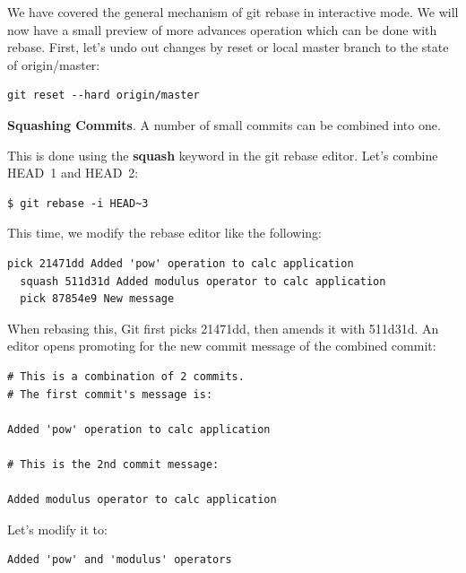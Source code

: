 \documentclass{../common/tufte-latex/tufte-handout}
\begin{document}
\noindent We have covered the general mechanism of git rebase in interactive mode. 
We will now have a small preview of more advances operation which can be done with rebase.
First, let's undo out changes by reset or local master branch to the state of origin/master:

\begin{lstlisting}[style=BashInputStyle]
  git reset --hard origin/master
\end{lstlisting}

\noindent \textbf{Squashing Commits}.
A number of small commits can be combined into one.

This is done using the \textbf{squash} keyword in the git rebase editor.
Let's combine HEAD~1 and HEAD~2:

\begin{lstlisting}[style=BashInputStyle]
  $ git rebase -i HEAD~3
\end{lstlisting}

This time, we modify the rebase editor like the following:
\begin{lstlisting}[style=BashInputStyle]
  pick 21471dd Added 'pow' operation to calc application
  squash 511d31d Added modulus operator to calc application
  pick 87854e9 New message
\end{lstlisting}

When rebasing this, Git first picks 21471dd, then amends it with 511d31d.
An editor opens promoting for the new commit message of the combined commit:
\begin{lstlisting}[style=BashInputStyle]
# This is a combination of 2 commits.
# The first commit's message is:

Added 'pow' operation to calc application

# This is the 2nd commit message:

Added modulus operator to calc application
\end{lstlisting}

Let's modify it to:

\begin{lstlisting}[style=BashInputStyle]
Added 'pow' and 'modulus' operators
\end{lstlisting}
\end{document}
